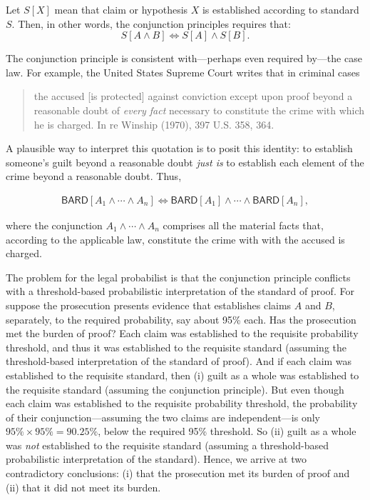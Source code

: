 \documentclass[
  10pt,
  dvipsnames,enabledeprecatedfontcommands]{scrartcl}
\newcommand{\et}{\wedge}
\begin{document}
\noindent Let \(S[X]\) mean that claim or hypothesis \(X\) is
established according to standard \(S\). Then, in other words, the
conjunction principles requires that:
\[S[A \wedge B] \Leftrightarrow S[A] \wedge S[B].\]

The conjunction principle is consistent with---perhaps even required
by---the case law. For example, the United States Supreme Court writes
that in criminal cases

\begin{quote}
the accused [is protected] against conviction except upon proof beyond a reasonable doubt of \textit{every fact} necessary to constitute the crime with which he is charged. In re Winship (1970), 397 U.S. 358, 364. 
\end{quote}

\noindent A plausible way to interpret this quotation is to posit this
identity: to establish someone's guilt beyond a reasonable doubt
\textit{just is} to establish each element of the crime beyond a
reasonable doubt. Thus,

\begin{align*}\mathsf{BARD}[A_1 \wedge \cdots \wedge A_n] \Leftrightarrow \mathsf{BARD}[A_1] \wedge \cdots \wedge \mathsf{BARD}[A_n],
\end{align*}

\noindent where the conjunction \(A_1 \et \cdots \et A_n\) comprises all
the material facts that, according to the applicable law, constitute the
crime with with the accused is charged.

The problem for the legal probabilist is that the conjunction principle
conflicts with a threshold-based probabilistic interpretation of the
standard of proof. For suppose the prosecution presents evidence that
establishes claims \(A\) and \(B\), separately, to the required
probability, say about 95\% each. Has the prosecution met the burden of
proof? Each claim was established to the requisite probability
threshold, and thus it was established to the requisite standard
(assuming the threshold-based interpretation of the standard of proof).
And if each claim was established to the requisite standard, then (i)
guilt as a whole was established to the requisite standard (assuming the
conjunction principle). But even though each claim was established to
the requisite probability threshold, the probability of their
conjunction---assuming the two claims are independent---is only
\(95\%\times95\%=90.25\%\), below the required 95\% threshold. So (ii)
guilt as a whole was \textit{not} established to the requisite standard
(assuming a threshold-based probabilistic interpretation of the
standard). Hence, we arrive at two contradictory conclusions: (i) that
the prosecution met its burden of proof and (ii) that it did not meet
its burden.
\end{document}
